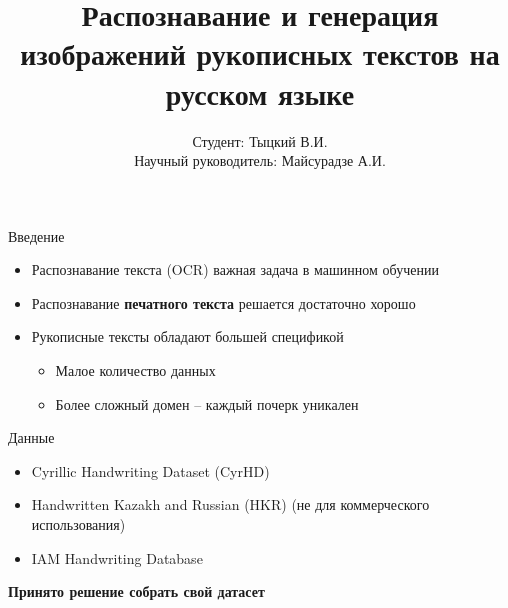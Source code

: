 \documentclass[fleqn, xcolor=x11names]{beamer}
\title{\bfseries Распознавание и генерация изображений рукописных текстов на русском языке}
\author[Тыцкий В.И.]{Студент: Тыцкий В.И. \\[1ex]  {\small Научный руководитель: Майсурадзе А.И.}}
\institute[ВМК МГУ]{МГУ имени М. В. Ломоносова, факультет ВМК, кафедра ММП}
\date{}
\begin{document}
\begin{frame}
    \titlepage
\end{frame}




\begin{frame}{Введение}
    \begin{itemize}
        \item Распознавание текста (OCR) важная задача в машинном обучении
        \item Распознавание \textbf{печатного текста} решается достаточно хорошо
        \item Рукописные тексты обладают большей спецификой
        \begin{itemize}
            \item Малое количество данных
            \item Более сложный домен -- каждый почерк уникален
        \end{itemize}
    \end{itemize}
    
\end{frame}


\begin{frame}{Данные}
    
    \begin{itemize}
        \item Cyrillic Handwriting Dataset (CyrHD)  \cite{chd}
        \item Handwritten Kazakh and Russian (HKR) (не для коммерческого использования)  \cite{hkr}
        \item IAM Handwriting Database \cite{iam}
    \end{itemize}

    \vspace{10pt}
    \textbf{Принято решение собрать свой датасет}
    
\end{frame}
\end{document}
